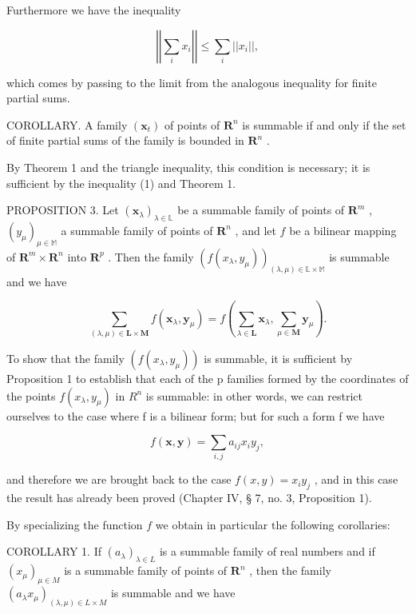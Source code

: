 Furthermore we have the inequality

\[
\left| \left| \sum_ {i} x _ {i} \right| \right| \leqslant \sum_ {i} | | x _ {i} | |,\tag{2}
\]

which comes by passing to the limit from the analogous inequality for finite partial sums.

COROLLARY. A family \((\pmb{x}_t)\) of points of \(\mathbf{R}^n\) is summable if and only if the set of finite partial sums of the family is bounded in \(\mathbf{R}^n\) .

By Theorem 1 and the triangle inequality, this condition is necessary; it is sufficient by the inequality (1) and Theorem 1.

PROPOSITION 3. Let \((\pmb{x}_{\lambda})_{\lambda \in \mathbb{L}}\) be a summable family of points of \(\mathbf{R}^m\) , \((y_{\mu})_{\mu \in \mathbb{M}}\) a summable family of points of \(\mathbf{R}^n\) , and let \(f\) be a bilinear mapping of \(\mathbf{R}^m \times \mathbf{R}^n\) into \(\mathbf{R}^p\) . Then the family \((f(x_{\lambda}, y_{\mu}))_{(\lambda, \mu) \in \mathbb{L} \times \mathbb{M}}\) is summable and we have

\[
\sum_ {(\lambda , \mu) \in \mathbf {L} \times \mathbf {M}} f \left(\boldsymbol {x} _ {\lambda}, \boldsymbol {y} _ {\mu}\right) = f \left(\sum_ {\lambda \in \mathbf {L}} \boldsymbol {x} _ {\lambda}, \sum_ {\mu \in \mathbf {M}} \boldsymbol {y} _ {\mu}\right).\tag{3}
\]

To show that the family \((f(x_{\lambda}, y_{\mu}))\) is summable, it is sufficient by Proposition 1 to establish that each of the p families formed by the coordinates of the points \(f(x_{\lambda}, y_{\mu})\) in \(R^{n}\) is summable: in other words, we can restrict ourselves to the case where f is a bilinear form; but for such a form f we have

\[
f (\boldsymbol {x}, \boldsymbol {y}) = \sum_ {i, j} a _ {i j} x _ {i} y _ {j},
\]

and therefore we are brought back to the case \(f(x, y) = x_i y_j\) , and in this case the result has already been proved (Chapter IV, § 7, no. 3, Proposition 1).

By specializing the function \(f\) we obtain in particular the following corollaries:

COROLLARY 1. If \((a_{\lambda})_{\lambda \in L}\) is a summable family of real numbers and if \((x_{\mu})_{\mu \in M}\) is a summable family of points of \(\mathbf{R}^n\) , then the family \((a_{\lambda}x_{\mu})_{(\lambda, \mu) \in L \times M}\) is summable and we have

